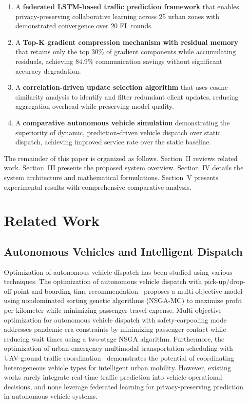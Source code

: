 \documentclass[journal]{IEEEtran}
\begin{document}
\begin{enumerate}
    \item A \textbf{federated LSTM-based traffic prediction framework} that enables privacy-preserving collaborative learning across 25 urban zones with demonstrated convergence over 20 FL rounds.
    \item A \textbf{Top-K gradient compression mechanism with residual memory} that retains only the top 30\% of gradient components while accumulating residuals, achieving 84.9\% communication savings without significant accuracy degradation.
    \item A \textbf{correlation-driven update selection algorithm} that uses cosine similarity analysis to identify and filter redundant client updates, reducing aggregation overhead while preserving model quality.
    \item A \textbf{comparative autonomous vehicle simulation} demonstrating the superiority of dynamic, prediction-driven vehicle dispatch over static dispatch, achieving improved service rate over the static baseline.
\end{enumerate}

The remainder of this paper is organized as follows. Section~II reviews related work. Section~III presents the proposed system overview. Section~IV details the system architecture and mathematical formulations. Section~V presents experimental results with comprehensive comparative analysis.


\section{Related Work}

\subsection{Autonomous Vehicles and Intelligent Dispatch}
Optimization of autonomous vehicle dispatch has been studied using various techniques. The optimization of autonomous vehicle dispatch with pick-up/drop-off-point and boarding-time recommendation~\cite{ref1} proposes a multi-objective model using nondominated sorting genetic algorithms (NSGA-MC) to maximize profit per kilometer while minimizing passenger travel expense. Multi-objective optimization for autonomous vehicle dispatch with safety-carpooling mode~\cite{ref2} addresses pandemic-era constraints by minimizing passenger contact while reducing wait times using a two-stage NSGA algorithm. Furthermore, the optimization of urban emergency multimodal transportation scheduling with UAV-ground traffic coordination~\cite{ref3} demonstrates the potential of coordinating heterogeneous vehicle types for intelligent urban mobility. However, existing works rarely integrate real-time traffic prediction into vehicle operational decisions, and none leverage federated learning for privacy-preserving prediction in autonomous vehicle systems.
\end{document}
